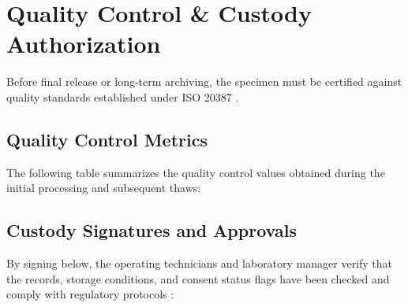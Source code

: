 \section{Quality Control \& Custody Authorization}

Before final release or long-term archiving, the specimen must be certified against quality standards established under ISO 20387 \cite{iso20387}.

\subsection{Quality Control Metrics}
The following table summarizes the quality control values obtained during the initial processing and subsequent thaws:

\vspace{5pt}

\subsection{Custody Signatures and Approvals}
By signing below, the operating technicians and laboratory manager verify that the records, storage conditions, and consent status flags have been checked and comply with regulatory protocols \cite{isber2018best, nci2016best}:

